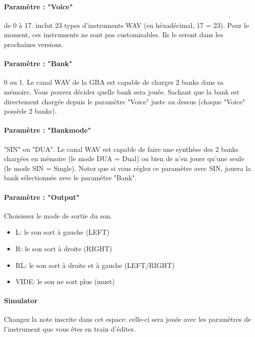 \documentclass[12pt,a4paper]{article}
\begin{document}
        \paragraph{Paramètre : "Voice"} de 0 à 17. \FAT inclut 23 types d'instruments WAV (en héxadécimal, 17 = 23). Pour le moment, ces instruments ne sont pas customisables. Ils le seront dans les prochaines versions.
        
        \paragraph{Paramètre : "Bank"} 0 ou 1. Le canal WAV de la GBA est capable de charger 2 banks dans sa mémoire. Vous pouvez décider quelle bank sera jouée. Sachant que la bank est directement chargée depuis le paramètre "Voice" juste au dessus (chaque "Voice" possède 2 banks).
        
        \paragraph{Paramètre : "Bankmode"} "SIN" ou "DUA". Le canal WAV est capable de faire une synthèse des 2 banks chargées en mémoire (le mode DUA = Dual) ou bien de n'en jouer qu'une seule (le mode SIN = Single). Notez que si vous réglez ce paramètre avec SIN, \FAT jouera la bank sélectionnée avec le paramètre "Bank".
        
        \paragraph{Paramètre : "Output"} Choisissez le mode de sortie du son.
            \begin{itemize}
                \item{L: le son sort à gauche (LEFT)}
                \item{R: le son sort à droite (RIGHT)}
                \item{RL: le son sort à droite et à gauche (LEFT/RIGHT)}
                \item{VIDE: le son ne sort plus (muet)}
            \end{itemize}
        
        \paragraph{Simulator} Changez la note inscrite dans cet espace: celle-ci sera jouée avec les paramètres de l'instrument que vous êtes en train d'éditer.
        
\end{document}
